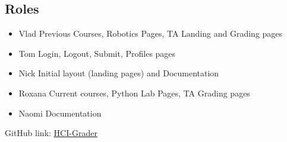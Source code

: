 \subsection{Roles}


\begin{itemize}
  \item {Vlad} Previous Courses, Robotics Pages, TA Landing and Grading pages
  \item {Tom} Login, Logout, Submit, Profiles pages
  \item {Nick} Initial layout (landing pages) and Documentation
  \item {Roxana} Current courses, Python Lab Pages, TA Grading pages
  \item{Naomi} Documentation
\end{itemize}

GitHub link: \href{https://github.com/tkw1536/HCI_Grader}{HCI-Grader}